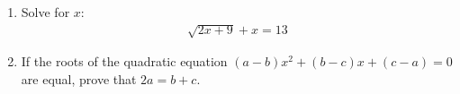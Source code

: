 \documentclass{article}
\begin{document}
\begin{enumerate}
\item Solve for $x$:                                                                              \begin{align}                                                                                       \sqrt{2x+9} + x = 13                                                                       \end{align}
\item If the roots of the quadratic equation $(a-b)x^2 + (b-c)x + (c-a) = 0$ are equal, prove that $2a = b + c$.
\end{enumerate}
  
\end{document}
